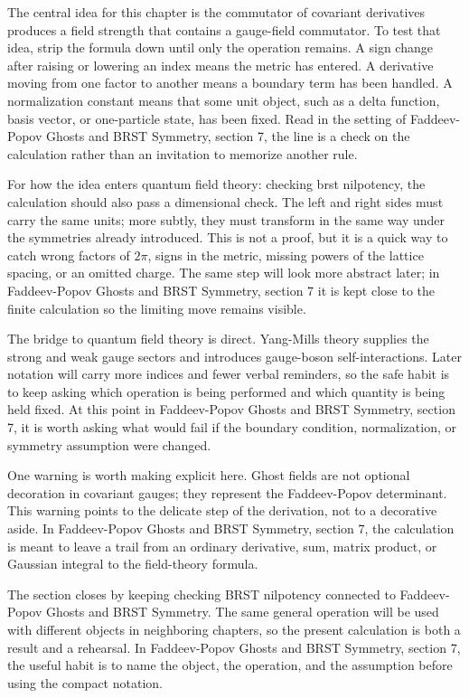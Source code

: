 The central idea for this chapter is the commutator of covariant derivatives produces a field strength that contains a gauge-field commutator.  To test that idea, strip the formula down until only the operation remains.  A sign change after raising or lowering an index means the metric has entered.  A derivative moving from one factor to another means a boundary term has been handled.  A normalization constant means that some unit object, such as a delta function, basis vector, or one-particle state, has been fixed.  Read in the setting of Faddeev-Popov Ghosts and BRST Symmetry, section 7, the line is a check on the calculation rather than an invitation to memorize another rule.

For how the idea enters quantum field theory: checking brst nilpotency, the calculation should also pass a dimensional check.  The left and right sides must carry the same units; more subtly, they must transform in the same way under the symmetries already introduced.  This is not a proof, but it is a quick way to catch wrong factors of \(2\pi\), signs in the metric, missing powers of the lattice spacing, or an omitted charge.  The same step will look more abstract later; in Faddeev-Popov Ghosts and BRST Symmetry, section 7 it is kept close to the finite calculation so the limiting move remains visible.

The bridge to quantum field theory is direct.  Yang-Mills theory supplies the strong and weak gauge sectors and introduces gauge-boson self-interactions.  Later notation will carry more indices and fewer verbal reminders, so the safe habit is to keep asking which operation is being performed and which quantity is being held fixed.  At this point in Faddeev-Popov Ghosts and BRST Symmetry, section 7, it is worth asking what would fail if the boundary condition, normalization, or symmetry assumption were changed.

One warning is worth making explicit here.  Ghost fields are not optional decoration in covariant gauges; they represent the Faddeev-Popov determinant.  This warning points to the delicate step of the derivation, not to a decorative aside.  In Faddeev-Popov Ghosts and BRST Symmetry, section 7, the calculation is meant to leave a trail from an ordinary derivative, sum, matrix product, or Gaussian integral to the field-theory formula.

The section closes by keeping checking BRST nilpotency connected to Faddeev-Popov Ghosts and BRST Symmetry.  The same general operation will be used with different objects in neighboring chapters, so the present calculation is both a result and a rehearsal.  In Faddeev-Popov Ghosts and BRST Symmetry, section 7, the useful habit is to name the object, the operation, and the assumption before using the compact notation.



